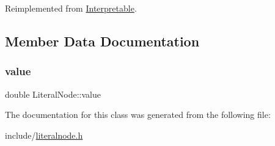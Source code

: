 Reimplemented from \hyperlink{classInterpretable_a32f547aaf68dcbab993284d3257ab010}{Interpretable}.



\subsection{Member Data Documentation}
\mbox{\label{classLiteralNode_aaead85ec08c6a4ec23534a547176a450}} 
\subsubsection{\texorpdfstring{value}{value}}
{\footnotesize\ttfamily double Literal\+Node\+::value}



The documentation for this class was generated from the following file\+:\begin{DoxyCompactItemize}
\item 
include/\hyperlink{literalnode_8h}{literalnode.\+h}\end{DoxyCompactItemize}
